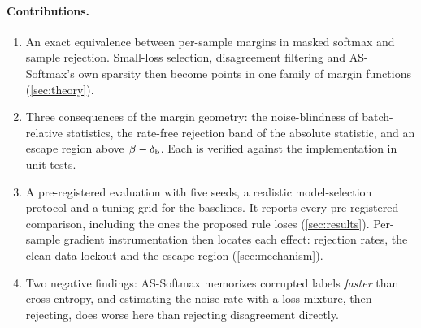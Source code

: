 \paragraph{Contributions.}
\begin{enumerate}
  \item An exact equivalence between per-sample margins in masked softmax and sample rejection.
  Small-loss selection, disagreement filtering and AS-Softmax's own sparsity then become points in
  one family of margin functions (\cref{sec:theory}).
  \item Three consequences of the margin geometry: the noise-blindness of batch-relative
  statistics, the rate-free rejection band of the absolute statistic, and an escape region above
  $\beta - \delta_{\mathrm{b}}$. Each is verified against the implementation in unit tests.
  \item A pre-registered evaluation with five seeds, a realistic model-selection protocol and a
  tuning grid for the baselines. It reports every pre-registered comparison, including the ones the
  proposed rule loses (\cref{sec:results}). Per-sample gradient instrumentation then locates each
  effect: rejection rates, the clean-data lockout and the escape region (\cref{sec:mechanism}).
  \item Two negative findings: AS-Softmax memorizes corrupted labels \emph{faster} than
  cross-entropy, and estimating the noise rate with a loss mixture, then rejecting, does worse
  here than rejecting disagreement directly.
\end{enumerate}
